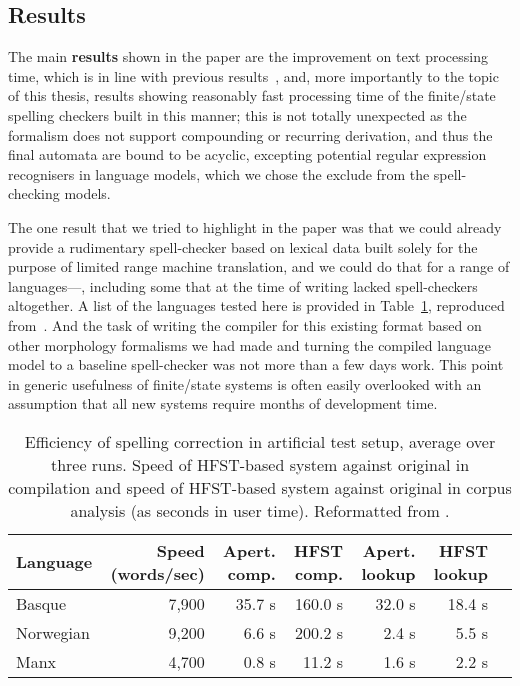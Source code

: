 \documentclass[officiallayout,final]{unihelcompling}
\begin{document}
\subsection{Results}

The main \textbf{results} shown in the paper are the improvement on text
processing time, which is in line with previous
results~\citep{silfverberg2009hfst}, and, more importantly to the topic of this
thesis, results showing reasonably fast processing time of the finite\-/state
spelling checkers built in this manner; this is not totally unexpected as the
formalism does not support compounding or recurring derivation, and thus the
final automata are bound to be acyclic, excepting potential regular
expression recognisers in language models, which we chose the exclude from
the spell-checking models.

The one result that we tried to highlight in the paper was that we could
already provide a rudimentary spell-checker based on lexical data built solely
for the purpose of limited range machine translation, and we could do that for
a range of languages---, including some that at the time
of writing lacked spell-checkers altogether. A list of the languages tested
here is provided in Table~\ref{table:lrec-2012-repro}, reproduced
from~. And the task of writing the compiler
for this existing format based on other morphology formalisms we had made and
turning the compiled language model to a baseline spell-checker was not more
than a few days work. This point in generic usefulness of finite\-/state
systems is often easily overlooked with an assumption that all new systems
require months of development time.

\begin{table}
    \centering
    \begin{small}
\begin{tabular}{|l|r|r||r|r||r|r|}
\hline
\bf Language & \bf Speed (words/sec) & \bf Apert. comp. & \bf HFST comp. & \bf Apert. lookup & \bf HFST lookup \\
\hline
Basque       &  7,900  & 35.7 s & 160.0  s & 32.0 s & 18.4 s \\
Norwegian    &  9,200  & 6.6 s  & 200.2 s  & 2.4 s  & 5.5  s \\
Manx         &  4,700  & 0.8 s  & 11.2  s  & 1.6 s  & 2.2  s \\
\hline
\end{tabular}
\end{small}
  \caption{Efficiency of spelling correction in artificial test setup, average 
  over three runs. Speed of HFST-based system against original in compilation
  and speed of HFST-based system against original in corpus analysis (as
  seconds in user time).  Reformatted from .
  \label{table:lrec-2012-repro}}
\end{table}
\end{document}
